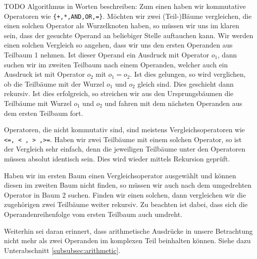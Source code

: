 TODO Algorithmus in Worten beschreiben: 
Zum einen haben wir kommutative Operatoren wie \verb|{+,*,AND,OR,=}|. Möchten wir zwei (Teil-)Bäume vergleichen, die einen solchen Operator als Wurzelknoten haben, so müssen wir uns im klaren sein, dass der gesuchte Operand an beliebiger Stelle auftauchen kann. Wir werden einen solchen Vergleich so angehen, dass wir uns den ersten Operanden aus Teilbaum 1 nehmen. Ist dieser Operand ein Ausdruck mit Operator $o_1$, dann suchen wir im zweiten Teilbaum nach einem Operanden, welcher auch ein Ausdruck ist mit Operator $o_2$ mit $o_1=o_2$. Ist dies gelungen, so wird verglichen, ob die Teilbäume mit der Wurzel $o_1$ und $o_2$ gleich sind. Dies geschieht dann rekursiv. Ist dies erfolgreich, so streichen wir aus den Ursprungsbäumen die Teilbäume mit Wurzel $o_1$ und $o_2$ und fahren mit dem nächsten Operanden aus dem ersten Teilbaum fort.

Operatoren, die nicht kommutativ sind, sind meistens Vergleichsoperatoren wie \verb|<=, < , > ,>=|. Haben wir zwei Teilbäume mit einem solchen Operator, so ist der Vergleich sehr einfach, denn die jeweiligen Teilbäume unter den Operatoren müssen absolut identisch sein. Dies wird wieder mittels Rekursion geprüft.

Haben wir im ersten Baum einen Vergleichsoperator ausgewählt und können diesen im zweiten Baum nicht finden, so müssen wir auch nach dem umgedrehten Operator in Baum 2 suchen. Finden wir einen solchen, dann vergleichen wir die zugehörigen zwei Teilbäume weiter rekursiv. Zu beachten ist dabei, dass sich die Operandenreihenfolge vom ersten Teilbaum auch umdreht.

Weiterhin sei daran erinnert, dass arithmetische Ausdrücke in unsere Betrachtung nicht mehr als zwei Operanden im komplexen Teil beinhalten können. Siehe dazu Unterabschnitt \ref{subsubsec:arithmetic}.
